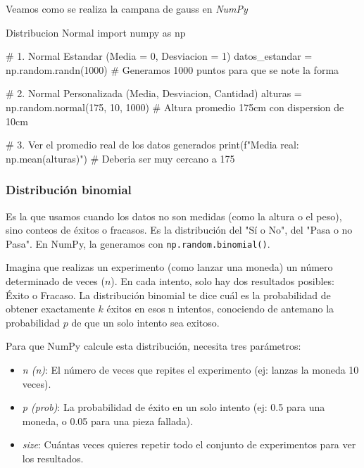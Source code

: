 Veamos como se realiza la campana de gauss en \textit{NumPy}
\begin{pycode}{Distribucion Normal}
import numpy as np

# 1. Normal Estandar (Media = 0, Desviacion = 1)
datos_estandar = np.random.randn(1000) # Generamos 1000 puntos para que se note la forma

# 2. Normal Personalizada (Media, Desviacion, Cantidad)
alturas = np.random.normal(175, 10, 1000) # Altura promedio 175cm con dispersion de 10cm

# 3. Ver el promedio real de los datos generados
print(f"Media real: {np.mean(alturas)}") # Deberia ser muy cercano a 175
\end{pycode}




\subsubsection{Distribución binomial}

Es la que usamos cuando los datos no son medidas (como la altura o el peso), sino conteos de éxitos o fracasos. Es la distribución del "Sí o No", del "Pasa o no Pasa". En NumPy, la generamos con \texttt{np.random.binomial()}.

Imagina que realizas un experimento (como lanzar una moneda) un número determinado de veces (\(n\)). En cada intento, solo hay dos resultados posibles: Éxito o Fracaso. La distribución binomial te dice cuál es la probabilidad de obtener exactamente \(k\) éxitos en esos n intentos, conociendo de antemano la probabilidad \(p\) de que un solo intento sea exitoso.


Para que NumPy calcule esta distribución, necesita tres parámetros:
\begin{itemize}
    \item \textit{n (n)}: El número de veces que repites el experimento (ej: lanzas la moneda 10 veces).
    \item \textit{p (prob)}: La probabilidad de éxito en un solo intento (ej: 0.5 para una moneda, o 0.05 para una pieza fallada).
    \item \textit{size}: Cuántas veces quieres repetir todo el conjunto de experimentos para ver los resultados.
\end{itemize}
    
